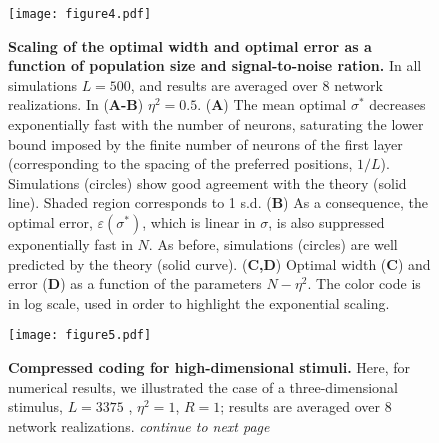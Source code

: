 \documentclass[a4paper]{article}%
\begin{document}
\begin{figure}[p]
\centering
\texttt{[image: figure4.pdf]}\caption{ \textbf{Scaling of the optimal width and optimal error as a function of population size and signal-to-noise ration.} In all simulations $L=500$, and results are averaged over 8 network
realizations. In (\textbf{A-B}) $\eta^{2} =0.5$.
(\textbf{A}) The mean optimal $\sigma^{*}$
decreases exponentially fast with the number of neurons, saturating the lower
bound imposed by the finite number of neurons of the first layer (corresponding to the spacing of the preferred positions, $1/L$). Simulations
(circles) show good agreement with the theory (solid line). Shaded region
corresponds to 1 s.d. 
(\textbf{B}) As a consequence, the optimal error,
$\varepsilon(\sigma^{*})$, which is linear in $\sigma$, is also suppressed
exponentially fast in $N$. As before, simulations (circles) are well predicted by
the theory (solid curve).
(\textbf{C,D}) Optimal width (\textbf{C}) and error (\textbf{D}) as a function
of the parameters  $N-\eta^{2}$. The color code is in log scale, used in order to highlight the exponential scaling.  }
\label{Fig:4}
\end{figure}\clearpage
\begin{figure}[p]
\texttt{[image: figure5.pdf]}\caption{\textbf{Compressed coding for high-dimensional stimuli.} Here, for numerical results, we illustrated the case of a three-dimensional stimulus, $L=3375$ , $\eta^{2} =1$, $R=1$; results are  averaged over 8 network
realizations. 
\emph{continue to next page}}
\end{figure}
\end{document}
